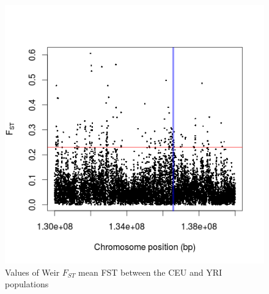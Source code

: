 \documentclass[a4paper,10pt]{article}
\begin{document}
\begin{figure}
\centering
\includegraphics{pictures/WeirCEUYRI.png}
\caption{Values of Weir $F_{ST}$ mean FST between the CEU and YRI populations}
\label{fig:a}
\end{figure}
\end{document}
